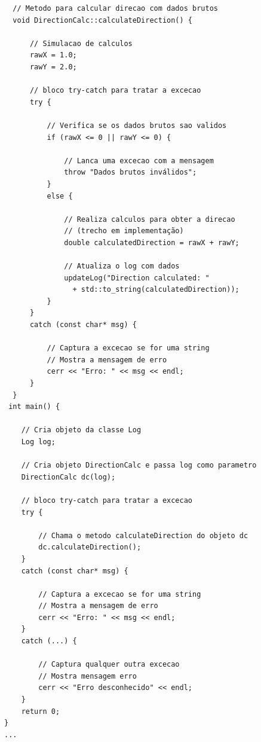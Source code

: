 \documentclass[10pt,twocolumn,letterpaper]{article}
\begin{document}
{\scriptsize
\begin{verbatim}
  // Metodo para calcular direcao com dados brutos
  void DirectionCalc::calculateDirection() {

      // Simulacao de calculos 
      rawX = 1.0;  
      rawY = 2.0;
  
      // bloco try-catch para tratar a excecao
      try {

          // Verifica se os dados brutos sao validos
          if (rawX <= 0 || rawY <= 0) {

              // Lanca uma excecao com a mensagem
              throw "Dados brutos inválidos";
          }
          else {

              // Realiza calculos para obter a direcao
              // (trecho em implementação)
              double calculatedDirection = rawX + rawY;
  
              // Atualiza o log com dados 
              updateLog("Direction calculated: " 
                + std::to_string(calculatedDirection));
          }
      }
      catch (const char* msg) {
        
          // Captura a excecao se for uma string
          // Mostra a mensagem de erro
          cerr << "Erro: " << msg << endl;
      }
  }
 int main() {

    // Cria objeto da classe Log
    Log log;

    // Cria objeto DirectionCalc e passa log como parametro
    DirectionCalc dc(log);

    // bloco try-catch para tratar a excecao
    try {

        // Chama o metodo calculateDirection do objeto dc
        dc.calculateDirection();
    }
    catch (const char* msg) {

        // Captura a excecao se for uma string
        // Mostra a mensagem de erro
        cerr << "Erro: " << msg << endl;
    }
    catch (...) {

        // Captura qualquer outra excecao
        // Mostra mensagem erro
        cerr << "Erro desconhecido" << endl;
    }
    return 0;
}
...
\end{verbatim}
}
\end{document}
